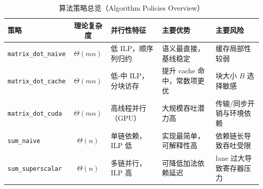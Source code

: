 \begin{table}[H]
\centering
\caption{算法策略总览（Algorithm Policies Overview）}
\label{tab:algorithm_policies_overview}
\footnotesize
\begin{tabularx}{\textwidth}{l c >{\raggedright\arraybackslash}X >{\raggedright\arraybackslash}X >{\raggedright\arraybackslash}X}
\toprule
策略 & 理论复杂度 & 并行性特征 & 主要优势 & 主要风险 \\
\midrule
\texttt{matrix\_dot\_naive} & $\Theta(mn)$ & 低 ILP，顺序列归约 & 语义最直接，基线稳定 & 缓存局部性较弱 \\
\texttt{matrix\_dot\_cache} & $\Theta(mn)$ & 低-中 ILP，分块访存 & 提升 cache 命中，常数项更优 & 块大小 $B$ 选择敏感 \\
\texttt{matrix\_dot\_cuda} & $\Theta(mn)$ & 高线程并行（GPU） & 大规模吞吐潜力高 & 传输/同步开销与环境依赖 \\
\texttt{sum\_naive} & $\Theta(n)$ & 单链依赖，ILP 低 & 实现最简单，可解释性高 & 依赖链长导致吞吐受限 \\
\texttt{sum\_superscalar} & $\Theta(n)$ & 多链并行，ILP 高 & 可降低加法依赖延迟 & lane 过大导致寄存器压力 \\
\bottomrule
\end{tabularx}
\end{table}

